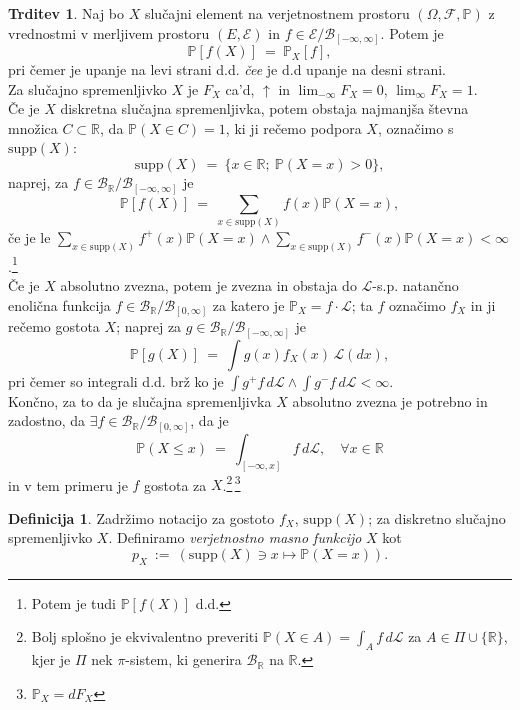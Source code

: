 \documentclass[11pt]{article}
\newcommand{\R}{\mathbb{R}}
\renewcommand{\P}{\mathbb{P}}
\newcommand{\F}{\mathcal{F}}
\newcommand{\B}{\mathscr{B}}
\newcommand{\LL}{\mathscr{L}}
\newcommand{\EE}{\mathcal{E}}
\newcommand{\set}[1]{\{#1\}}
\newcommand{\oklepaj}[1]{\left(#1\right)}
\newcommand{\1}{\mathbbm{1}}
\newcommand{\rr}{[-\infty,\infty]}
\newcommand{\supp}{\text{supp}}
\theoremstyle{definition}
\newtheorem{definicija}{Definicija}[section]
\theoremstyle{definition}
\newtheorem{trditev}{Trditev}[section]
\theoremstyle{definition}
\theoremstyle{definition}
\begin{document}
\begin{trditev}

Naj bo $X$ slučajni element na verjetnostnem prostoru $(\Omega, \F, \P)$ z vrednostmi v merljivem prostoru $(E, \EE)$ in $f \in \EE/\B_{\rr}$. Potem je
$$\P[f(X)] ~=~ \P_X[f],$$
pri čemer je upanje na levi strani d.d. \textit{čee} je d.d upanje na desni strani.\\

Za slučajno spremenljivko $X$ je $F_X$ ca'd, $\uparrow$ in $\lim_{-\infty} F_X=0$, \hbox{$\lim_\infty F_X=1$.} \\

Če je $X$ diskretna slučajna spremenljivka, potem obstaja najmanjša števna množica $C \subset \R$, da $\P(X \in C) = 1$, ki ji rečemo podpora $X$, označimo s $\supp(X)$:
$$\supp(X) ~=~ \set{x \in \R;~\P(X=x)>0},$$
naprej, za $f \in \B_\R/\B_{\rr}$ je
$$\P[f(X)] ~=~ \sum_{x \in \supp(X)} f(x)\P(X=x),$$
če je le $\sum_{x \in \supp(X)} f^+(x)\P(X=x) \wedge \sum_{x \in \supp(X)} f^-(x)\P(X=x) < \infty$.\footnote{Potem je tudi $\P[f(X)]$ d.d.} \\

Če je $X$ absolutno zvezna, potem je zvezna in obstaja do $\LL$-s.p. natančno enolična funkcija $f \in \B_\R/\B_{[0,\infty]}$ za katero je $\P_X = f \cdot \LL$; ta $f$ označimo $f_X$ in ji rečemo gostota $X$; naprej za $g \in \B_\R/\B_{\rr}$ je
$$\P[g(X)] ~=~ \int g(x)f_X(x)\,\LL(dx),$$
pri čemer so integrali d.d. brž ko je $\int g^+ f\,d\LL \wedge \int g^- f\,d\LL < \infty$. \\

Končno, za to da je slučajna spremenljivka $X$ absolutno zvezna je potrebno in zadostno, da $\exists f \in \B_\R/\B_{[0,\infty]}$, da je
$$\P(X \leq x) ~=~ \int_{[-\infty,x]} f\,d\LL, \quad \forall x \in \R$$
in v tem primeru je $f$ gostota za $X$.\footnote{Bolj splošno je ekvivalentno preveriti $\P(X \in A) = \int_A f\,d\LL$ za $A \in \Pi \cup \set{\R}$, kjer je $\Pi$ nek $\pi$-sistem, ki generira $\B_\R$ na $\R$.}\,\footnote{$\P_X = dF_X$}

\end{trditev}
\vspace{0.5cm}

\begin{definicija}

Zadržimo notacijo za gostoto $f_X$, $\supp(X)$; za diskretno slučajno spremenljivko $X$. Definiramo \textit{verjetnostno masno funkcijo} $X$ kot
$$p_X ~:=~ \oklepaj{\supp(X) \ni x \mapsto \P(X=x)}.$$

\end{definicija}
\vspace{1cm}
\end{document}
